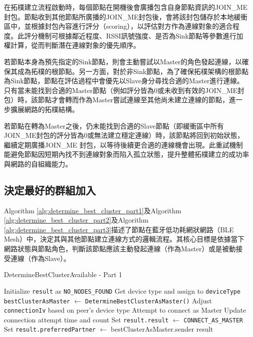\begin{ZhChapter}
在拓樸建立流程啟動時，每個節點在開機後會廣播包含自身節點資訊的JOIN\_ME封包。節點收到其他節點所廣播的JOIN\_ME封包後，會將該封包儲存於本地緩衝區中，並根據封包內容進行評分（scoring），以評估對方作為連線對象的適合程度。此評分機制可根據鄰近程度、RSSI訊號強度、是否為Sink節點等參數進行加權計算，從而判斷潛在連線對象的優先順序。

若節點本身為預先指定的Sink節點，則會主動嘗試以Master的角色發起連線，以確保其成為拓樸的根節點。另一方面，對於非Sink節點，為了確保拓樸架構的根節點為Sink節點，節點在評估過程中會優先以Slave身分尋找合適的Master進行連線。只有當未能找到合適的Master節點（例如評分皆為0或未收到有效的JOIN\_ME封包）時，該節點才會轉而作為Master嘗試連線至其他尚未建立連線的節點，進一步擴展網路的拓樸結構。

若節點在轉為Master之後，仍未能找到合適的Slave節點（即緩衝區中所有JOIN\_ME封包的評分皆為0或無法建立穩定連線）時，該節點將回到初始狀態，繼續定期廣播JOIN\_ME 封包，以等待後續更合適的連線機會出現。此重試機制能避免節點因短期內找不到連線對象而陷入孤立狀態，提升整體拓樸建立的成功率與網路的自組織能力。

\subsection{決定最好的群組加入}

Algorithm \ref{alg:determine_best_cluster_part1}及Algorithm \ref{alg:determine_best_cluster_part2}及Algorithm \ref{alg:determine_best_cluster_part3}描述了節點在藍牙低功耗網狀網路（BLE Mesh）中，決定其與其他節點建立連線方式的邏輯流程。其核心目標是依據當下網路狀態與節點角色，判斷該節點應該主動發起連線（作為Master）或是被動接受連線（作為Slave）。

\begin{algorithm}[H]
\caption{DetermineBestClusterAvailable - Part 1}
\label{alg:determine_best_cluster_part1}
\begin{algorithmic}[1]
\State Initialize \texttt{result} as \texttt{NO\_NODES\_FOUND}
\State Get device type and assign to \texttt{deviceType}
    \State \texttt{bestClusterAsMaster} $\gets$ \texttt{DetermineBestClusterAsMaster()}
        \State Adjust \texttt{connectionIv} based on peer’s device type
        \State Attempt to connect as Master
            \State Update connection attempt time and count
        \EndIf
        \State Set \texttt{result.result} $\gets$ \texttt{CONNECT\_AS\_MASTER}
        \State Set \texttt{result.preferredPartner} $\gets$ bestClusterAsMaster.sender
        \State \Return result
    \EndIf
\EndIf
\end{algorithmic}
\end{algorithm}


\end{ZhChapter}
